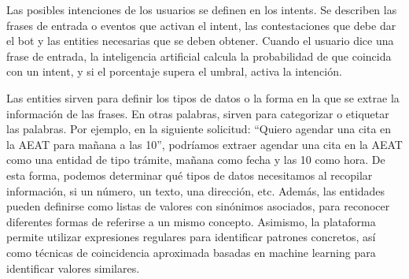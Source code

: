     Las posibles intenciones de los usuarios se definen en los intents. 
    Se describen las frases de entrada o eventos que activan el intent, las contestaciones que debe dar el bot y las entities necesarias que se deben obtener. 
    Cuando el usuario dice una frase de entrada, la inteligencia artificial calcula la probabilidad de que coincida con un intent, y si el porcentaje supera el umbral, activa la intención.
        
    Las entities sirven para definir los tipos de datos o la forma en la que se extrae la información de las frases.
    En otras palabras, sirven para categorizar o etiquetar las palabras. 
    Por ejemplo, en la siguiente solicitud: ``Quiero agendar una cita en la AEAT para mañana a las 10'', podríamos extraer agendar una cita en la AEAT como una entidad de tipo trámite, mañana como fecha y las 10 como hora. 
    De esta forma, podemos determinar qué tipos de datos necesitamos al recopilar información, si un número, un texto, una dirección, etc. 
    Además, las entidades pueden definirse como listas de valores con sinónimos asociados, para reconocer diferentes formas de referirse a un mismo concepto.
    Asimismo, la plataforma permite utilizar expresiones regulares para identificar patrones concretos, así como técnicas de coincidencia aproximada basadas en machine learning para identificar valores similares. 
        

